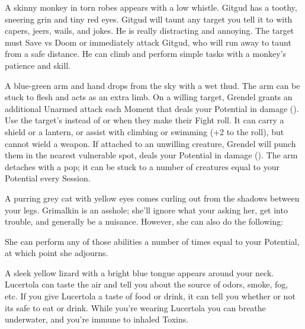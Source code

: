 A skinny monkey in torn robes appears with a low whistle.  Gitgud has a toothy, sneering grin and tiny red eyes.  Gitgud will taunt any target you tell it to with capers, jeers, wails, and jokes.  He is really distracting and annoying.  The target must Save vs Doom or immediately attack Gitgud, who will run away to taunt from a safe distance.  He can climb and perform simple tasks with a monkey's patience and skill.


A blue-green arm and hand drops from the sky with a wet thud.  The arm can be stuck to flesh and acts as an extra limb.  On a willing target, Grendel grants an additional Unarmed attack each Moment that deals your Potential in damage ().  Use the target's \FOC instead of \VIG or \DEX when they make their Fight roll.  It can carry a shield or a lantern, or assist with climbing or swimming (+2 to the roll), but cannot wield a weapon.  If attached to an unwilling creature, Grendel will punch them in the nearest vulnerable spot, deals your Potential in damage ().  The arm detaches with a pop;  it can be stuck to a number of creatures equal to your Potential every Session.


A purring grey cat with yellow eyes comes curling out from the shadows between your legs.  Grimalkin is an asshole; she'll ignore what your asking her, get into trouble, and generally be a nuisance.  However, she can also do the following:


She can perform any of those abilities a number of times equal to your Potential, at which point she adjourns.


A sleek yellow lizard with a bright blue tongue appears around your neck.  Lucertola can taste the air and tell you about the source of odors, smoke, fog, etc.  If you give Lucertola a taste of food or drink, it can tell you whether or not its safe to eat or drink.  While you're wearing Lucertola you can breathe underwater, and you're immune to inhaled Toxins.

